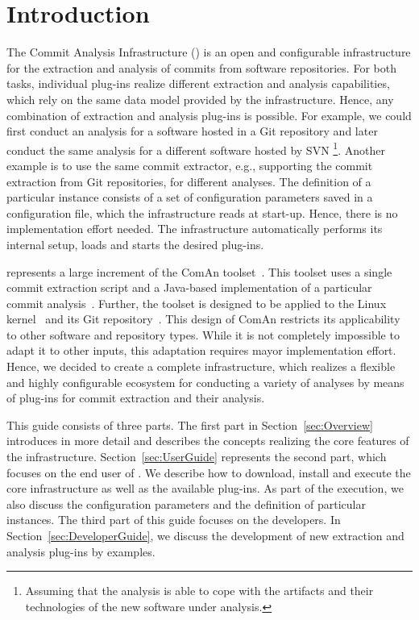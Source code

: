 \section{Introduction}
\label{sec:Introduction}
The Commit Analysis Infrastructure (\thetool{}) is an open and configurable infrastructure for the extraction and analysis of commits from software repositories. For both tasks, individual plug-ins realize different extraction and analysis capabilities, which rely on the same data model provided by the infrastructure. Hence, any combination of extraction and analysis plug-ins is possible. For example, we could first conduct an analysis for a software hosted in a Git repository \cite{Git18} and later conduct the same analysis for a different software hosted by SVN \cite{Svn18}\footnote{Assuming that the analysis is able to cope with the artifacts and their technologies of the new software under analysis.}. Another example is to use the same commit extractor, e.g., supporting the commit extraction from Git repositories, for different analyses. The definition of a particular \thetool{} instance consists of a set of configuration parameters saved in a configuration file, which the infrastructure reads at start-up. Hence, there is no implementation effort needed. The infrastructure automatically performs its internal setup, loads and starts the desired plug-ins.

\thetool{} represents a large increment of the ComAn toolset~\cite{Com18a}. This toolset uses a single commit extraction script and a Java-based implementation of a particular commit analysis~\cite{KS17a, KS17b, KGS18}. Further, the toolset is designed to be applied to the Linux kernel~\cite{Lin18a} and its Git repository~\cite{Lin18b}. This design of ComAn restricts its applicability to other software and repository types. While it is not completely impossible to adapt it to other inputs, this adaptation requires mayor implementation effort. Hence, we decided to create a complete infrastructure, which realizes a flexible and highly configurable ecosystem for conducting a variety of analyses by means of plug-ins for commit extraction and their analysis.

This guide consists of three parts. The first part in Section~\ref{sec:Overview} introduces \thetool{} in more detail and describes the concepts realizing the core features of the infrastructure. Section~\ref{sec:UserGuide} represents the second part, which focuses on the end user of \thetool{}. We describe how to download, install and execute the core infrastructure as well as the available plug-ins. As part of the execution, we also discuss the configuration parameters and the definition of particular \thetool{} instances. The third part of this guide focuses on the developers. In Section~\ref{sec:DeveloperGuide}, we discuss the development of new extraction and analysis plug-ins by examples.
